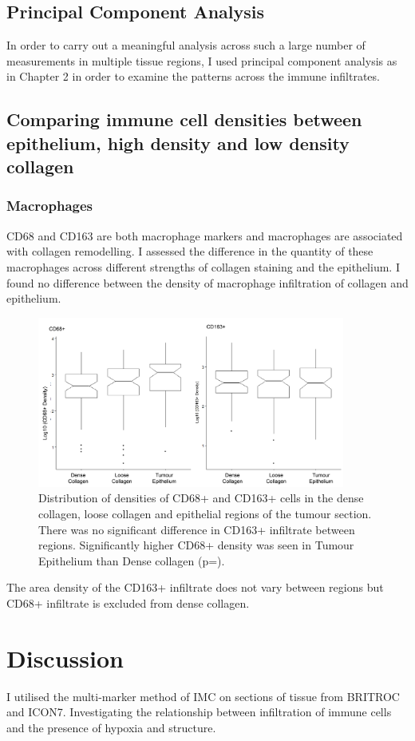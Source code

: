 \subsection{Principal Component Analysis}
In order to carry out a meaningful analysis across such a large number of measurements in multiple tissue regions, I used principal component analysis as in Chapter 2 in order to examine the patterns across the immune infiltrates. 

\subsection{Comparing immune cell densities between epithelium, high density and low density collagen}

\subsubsection{Macrophages}

CD68 and CD163 are both macrophage markers and macrophages are associated with collagen remodelling. I assessed the difference in the quantity of these macrophages across different strengths of collagen staining and the epithelium. I found no difference between the density of macrophage infiltration of collagen and epithelium.

\begin{figure}
    \centering
    \includegraphics[width=0.9\textwidth]{Chapter4/figs/Thesis-10.png}
    \caption{Distribution of densities of CD68+ and CD163+ cells in the dense collagen, loose collagen and epithelial regions of the tumour section. There was no significant difference in CD163+ infiltrate between regions. Significantly higher CD68+ density was seen in Tumour Epithelium than Dense collagen (p=).}
    \label{fig:distribution}
\end{figure}

The area density of the CD163+ infiltrate does not vary between regions but CD68+ infiltrate is excluded from dense collagen.




\section{Discussion}
I utilised the multi-marker method of IMC on sections of tissue from BRITROC and ICON7. Investigating the relationship between infiltration of immune cells and the presence of hypoxia and structure.
